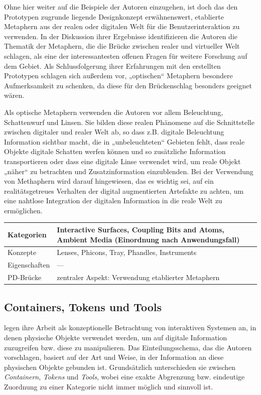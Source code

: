 Ohne hier weiter auf die Beispiele der Autoren einzugehen, ist doch das den Prototypen zugrunde liegende Designkonzept erwähnenswert, etablierte Metaphern aus der realen oder digitalen Welt für die Benutzerinteraktion zu verwenden. In der Diskussion ihrer Ergebnisse identifizieren die Autoren die Thematik der Metaphern, die die Brücke zwischen realer und virtueller Welt schlagen, als eine der interessantesten offenen Fragen für weitere Forschung auf dem Gebiet. Als Schlussfolgerung ihrer Erfahrungen mit den erstellten Prototypen schlagen sich außerdem vor, „optischen“ Metaphern besondere Aufmerksamkeit zu schenken, da diese für den Brückenschlag besonders geeignet wären. 

Als optische Metaphern verwenden die Autoren vor allem Beleuchtung, Schattenwurf und Linsen. Sie bilden diese realen Phänomene auf die Schnittstelle zwischen digitaler und realer Welt ab, so dass z.B. digitale Beleuchtung Information sichtbar macht, die in „unbeleuchteten“ Gebieten fehlt, dass reale Objekte digitale Schatten werfen können und so zusätzliche Information transportieren oder dass eine digitale Linse verwendet wird, um reale Objekt „näher“ zu betrachten und Zusatzinformation einzublenden. Bei der Verwendung von Methaphern wird darauf hingewiesen, das es wichtig sei, auf ein realitätsgetreues Verhalten der digital augmentierten Artefakte zu achten, um eine nahtlose Integration der digitalen Information in die reale Welt zu ermöglichen.

\begin{tabular}{| p{3cm} | p{10cm} |}
  \hline
  Kategorien & Interactive Surfaces, Coupling Bits and Atoms, Ambient Media (Einordnung nach Anwendungsfall) \\ \hline
  Konzepte & Lenses, Phicons, Tray, Phandles, Instruments \\ \hline
  Eigenschaften & --- \\ \hline
  PD-Brücke & zentraler Aspekt: Verwendung etablierter Metaphern \\ \hline
\end{tabular} 


\subsection{Containers, Tokens und Tools} %
\label{sub:containers_tokens_tools}

\citet{Holmquist99} legen ihre Arbeit als konzeptionelle Betrachtung von interaktiven Systemen an, in denen physische Objekte verwendet werden, um auf digitale Information zuzugreifen bzw. diese zu manipulieren. Das Einteilungsschema, das die Autoren vorschlagen, basiert auf der Art und Weise, in der Information an diese physischen Objekte gebunden ist. Grundsätzlich unterschieden sie zwischen \emph{Containern}, \emph{Tokens} und \emph{Tools}, wobei eine exakte Abgrenzung bzw. eindeutige Zuordnung zu einer Kategorie nicht immer möglich und sinnvoll ist.

